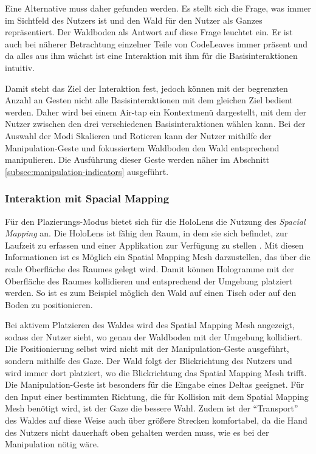 Eine Alternative muss daher gefunden werden. Es stellt sich die Frage, was immer im Sichtfeld des Nutzers ist und den Wald für den Nutzer als Ganzes repräsentiert. Der Waldboden als Antwort auf diese Frage leuchtet ein. Er ist auch bei näherer Betrachtung einzelner Teile von CodeLeaves immer präsent und da alles aus ihm wächst ist eine Interaktion mit ihm für die Basisinteraktionen intuitiv.

Damit steht das Ziel der Interaktion fest, jedoch können mit der begrenzten Anzahl an Gesten nicht alle Basisinteraktionen mit dem gleichen Ziel bedient werden. Daher wird bei einem Air-tap ein Kontextmenü dargestellt, mit dem der Nutzer zwischen den drei verschiedenen Basisinteraktionen wählen kann. Bei der Auswahl der Modi Skalieren und Rotieren kann der Nutzer mithilfe der Manipulation-Geste und fokussiertem Waldboden den Wald entsprechend manipulieren. Die Ausführung dieser Geste werden näher im Abschnitt \ref{subsec:manipulation-indicators} ausgeführt.

\subsubsection*{Interaktion mit Spacial Mapping}
Für den Plazierungs-Modus bietet sich für die HoloLens die Nutzung des \textit{Spacial Mapping} an. Die HoloLens ist fähig den Raum, in dem sie sich befindet, zur Laufzeit zu erfassen und einer Applikation zur Verfügung zu stellen \cite{windows2017spacial}. Mit diesen Informationen ist es Möglich ein Spatial Mapping Mesh darzustellen, das über die reale Oberfläche des Raumes gelegt wird. Damit können Hologramme mit der Oberfläche des Raumes kollidieren und entsprechend der Umgebung platziert werden. So ist es zum Beispiel möglich den Wald auf einen Tisch oder auf den Boden zu positionieren.

Bei aktivem Platzieren des Waldes wird des Spatial Mapping Mesh angezeigt, sodass der Nutzer sieht, wo genau der Waldboden mit der Umgebung kollidiert. Die Positionierung selbst wird nicht mit der Manipulation-Geste ausgeführt, sondern mithilfe des Gaze. Der Wald folgt der Blickrichtung des Nutzers und wird immer dort platziert, wo die Blickrichtung das Spatial Mapping Mesh trifft. Die Manipulation-Geste ist besonders für die Eingabe eines Deltas geeignet. Für den Input einer bestimmten Richtung, die für Kollision mit dem Spatial Mapping Mesh benötigt wird, ist der Gaze die bessere Wahl. Zudem ist der "`Transport"' des Waldes auf diese Weise auch über größere Strecken komfortabel, da die Hand des Nutzers nicht dauerhaft oben gehalten werden muss, wie es bei der Manipulation nötig wäre. 


